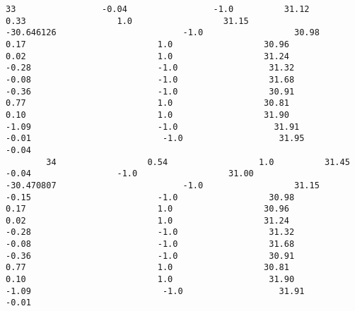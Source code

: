 \documentclass[11pt]{article}
\begin{document}
\begin{Verbatim}[commandchars=\\\{\}]
        33                 -0.04                 -1.0          31.12                  0.33                  1.0                  31.15                  -30.646126                         -1.0                  30.98                          0.17                          1.0                  30.96                          0.02                          1.0                  31.24                         -0.28                         -1.0                  31.32                         -0.08                         -1.0                  31.68                         -0.36                         -1.0                  30.91                          0.77                          1.0                  30.81                          0.10                          1.0                  31.90                         -1.09                         -1.0                   31.91                         -0.01                          -1.0                   31.95                          -0.04   
        34                  0.54                  1.0          31.45                 -0.04                 -1.0                  31.00                  -30.470807                         -1.0                  31.15                         -0.15                         -1.0                  30.98                          0.17                          1.0                  30.96                          0.02                          1.0                  31.24                         -0.28                         -1.0                  31.32                         -0.08                         -1.0                  31.68                         -0.36                         -1.0                  30.91                          0.77                          1.0                  30.81                          0.10                          1.0                   31.90                         -1.09                          -1.0                   31.91                          -0.01   
        

\end{Verbatim}
\end{document}
